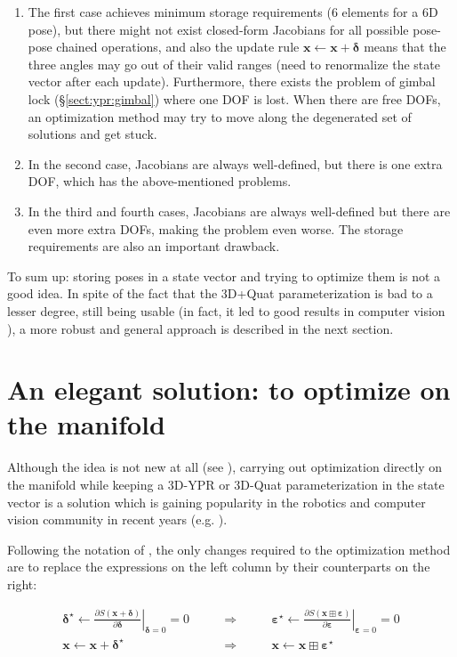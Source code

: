 \documentclass[a4paper,11pt]{report}
\newcommand{\E}{{\bm{\varepsilon}}}
\newcommand{\DEL}{{\bm{\delta}}}
\begin{document}
\begin{enumerate}
 \item The first case achieves minimum storage requirements (6 elements for a 6D pose), 
but there might not exist closed-form Jacobians for all possible pose-pose chained operations, 
and also the update rule $\mathbf{x}  \leftarrow \mathbf{x} + \DEL$ means that the three 
angles may go out of their valid ranges (need to renormalize the state vector after each update).
Furthermore, there exists the problem of gimbal lock (\S \ref{sect:ypr:gimbal}) where one
DOF is lost. When there are free DOFs, an optimization method may try to move along the 
degenerated set of solutions and get stuck.

\item In the second case, Jacobians are always well-defined, but there is one extra DOF, which has 
the above-mentioned problems.

\item In the third and fourth cases, Jacobians are always well-defined but there are 
even more extra DOFs, making the problem even worse. The storage requirements are also an 
important drawback.
\end{enumerate}

To sum up: storing poses in a state vector and trying to optimize 
them is not a good idea.  
In spite of the fact that 
the 3D+Quat parameterization is bad to a lesser degree, 
still being usable 
(in fact, it led to good results in computer vision \cite{davison2007mrt}),
a more robust and general approach is described in the next section.


\section{An elegant solution: to optimize on the manifold}
\label{sect:opti_manif}

Although the idea is not new at all (see \cite{gabay1982mdf}), 
carrying out optimization directly on the manifold while 
keeping a 3D-YPR or 3D-Quat parameterization in the 
state vector is a solution which is gaining popularity 
in the robotics and computer vision community in recent years
(e.g. \cite{hertzberg2008fsm,strasdat2010scale}).

Following the notation of \cite{hertzberg2008fsm}, the only changes required 
to the optimization method are 
to replace the expressions on the left column by their counterparts on the right:

\begin{eqnarray}
 \DEL^\star \leftarrow
\left. \frac{\partial S(\mathbf{x} + \DEL )}{\partial \DEL } 
\right|_{\DEL=0}  = 0
 & 
\quad \quad \Longrightarrow \quad \quad 
& 
 \E^\star \leftarrow
\left. \frac{\partial S(\mathbf{x} \boxplus {\E} )}{\partial \E } 
\right|_{\E=0}  = 0
\\
 \mathbf{x} \leftarrow \mathbf{x} + \DEL^\star
 & 
\quad \quad \Longrightarrow \quad \quad 
& 
 \mathbf{x} \leftarrow \mathbf{x} \boxplus \E^\star
\end{eqnarray}
\end{document}
